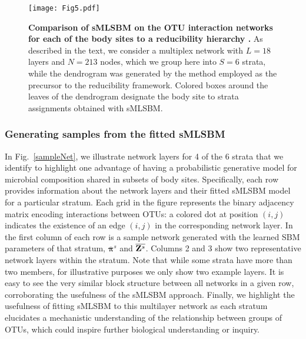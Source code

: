 \begin{figure}[t]
\begin{center}
\texttt{[image: Fig5.pdf]}
\caption{{\bf Comparison of sMLSBM on the OTU interaction networks \cite{sparcc} for each of the body sites to a reducibility hierarchy \cite{domen}.} As described in the text, we consider a multiplex network with $L=18$ layers and $N=213$ nodes, which we group here into $S=6$ strata, while the dendrogram was generated by the method employed as the precursor to the reducibility framework. Colored boxes around the leaves of the dendrogram designate the body site to strata assignments obtained with sMLSBM.}
\label{M5}
\end{center}
\end{figure}

\subsubsection{Generating samples from the fitted sMLSBM}

\indent In Fig.~\ref{sampleNet}, we illustrate network layers for 4 of the 6 strata that we identify to highlight one advantage of having a probabilistic generative model for microbial composition shared in subsets of body sites. Specifically, each row provides information about the network layers and their fitted sMLSBM model for a particular stratum. Each grid in the figure represents the binary adjacency matrix encoding interactions between OTUs: a colored dot at position $(i,j)$ indicates the existence of an edge $(i,j)$ in the corresponding network layer.
In the first column of each row is a sample network generated with the learned SBM parameters of that stratum, $\overline{{\boldsymbol \pi}}^{s}$ and $\overline{{\bf Z}^{s}}$. Columns 2 and 3 show two representative network layers within the stratum. Note that while some strata have more than two members, for illustrative purposes we only show two example layers. 
It is easy to see the very similar block structure between all networks in a given row, corroborating the usefulness of the sMLSBM approach. Finally, we highlight the usefulness of fitting sMLSBM to this multilayer network as each stratum
 elucidates a mechanistic understanding of the relationship between groups of OTUs, which could inspire further biological understanding or inquiry. 

